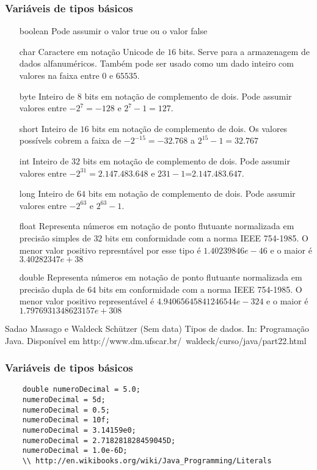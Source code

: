 \documentclass{beamer}
\begin{document}
\begin{frame}[fragile]
\frametitle{Variáveis de tipos básicos}
\scriptsize
\begin{itemize}
\item [boolean] Pode assumir o valor true ou o valor false
\item [char] 	Caractere em notação Unicode de $16$ bits. Serve para a armazenagem de dados alfanuméricos. Também pode ser usado como um dado inteiro com valores na faixa entre $0$ e $65535$.
\item [byte] 	Inteiro de 8 bits em notação de complemento de dois. Pode assumir valores entre $-2^7=-128$ e $2^{7}-1=127$.
\item [short] 	Inteiro de $16$ bits em notação de complemento de dois. Os valores possívels cobrem a faixa de $-2^{-15}=-32.768$ a $2^{15}-1=32.767$
\item [int]	Inteiro de $32$ bits em notação de complemento de dois. Pode assumir valores entre $-2^{31}=2.147.483.648$ e $231-1$=$2.147.483.647$.
\item [long]	Inteiro de $64$ bits em notação de complemento de dois. Pode assumir valores entre $-2^{63}$ e $2^{63}-1$.
\item [float]	Representa números em notação de ponto flutuante normalizada em precisão simples de $32$ bits em conformidade com a norma IEEE 754-1985. O menor valor positivo represntável por esse tipo é $1.40239846e-46$ e o maior é $3.40282347e+38$
\item [double] 	Representa números em notação de ponto flutuante normalizada em precisão dupla de $64$ bits em conformidade com a norma IEEE 754-1985. O menor valor positivo representável é $4.94065645841246544e-324$ e o maior é $1.7976931348623157e+308$
\end{itemize}
Sadao Massago e Waldeck Schützer (Sem data) Tipos de dados. In: Programação Java. Disponível em {http://www.dm.ufscar.br/~waldeck/curso/java/part22.html}
\end{frame}

\begin{frame}[fragile]
\frametitle{Variáveis de tipos básicos}
\begin{lstlisting}
    double numeroDecimal = 5.0;
    numeroDecimal = 5d;
    numeroDecimal = 0.5;
    numeroDecimal = 10f;
    numeroDecimal = 3.14159e0;
    numeroDecimal = 2.718281828459045D;
    numeroDecimal = 1.0e-6D;
    \\ http://en.wikibooks.org/wiki/Java_Programming/Literals
\end{lstlisting}
\end{frame}
\end{document}
